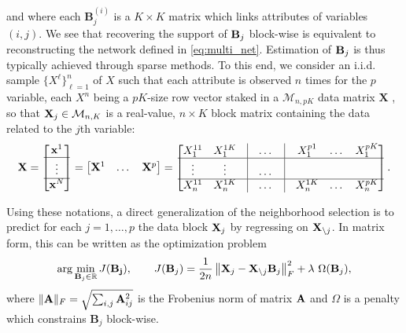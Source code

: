 and  where each  $\mathbf{B}_j^{(i)}$ is  a $K\times  K$ matrix  which
links attributes  of variables  $(i,j)$.  We  see that  recovering the
support of $\mathbf{B}_j$ block-wise is equivalent to reconstructing the network
defined  in  \eqref{eq:multi_net}.  Estimation   of  $\mathbf{B}_j$  is  thus
typically achieved through  sparse methods.  To this  end, we consider
an  i.i.d.   sample  $\{X^\ell\}_{\ell=1}^n$  of $X$  such  that  each
attribute is observed $n$ times for the $p$ variable, each $X^n$ being
a $pK$-size  row vector staked  in a $\mathcal{M}_{n,pK}$  data matrix
$\mathbf{X}$ , so that $\mathbf{X}_j  \in \mathcal{M}_{n,K}$ is a real-value,
$n \times  K$ block  matrix containing  the data  related to  the $j$th
variable:
\begin{multline*}
  \mathbf{X} = \begin{bmatrix}
    \mathbf{x}^1 \\ \hline
    \vdots \\\hline
    \mathbf{x}^N \\
  \end{bmatrix}
  = \begin{bmatrix}
    \mathbf{X}^1 & \dots & \mathbf{X}^p \\
  \end{bmatrix} 
  = \begin{bmatrix}
    X^{11}_1 & X^{1K}_1 & \vline & \dots & \vline & X^{p1}_1 & \dots & X^{pK}_1 \\ \hline
    \vdots & \vdots & \vline & \dots & \vline & & & \\ \hline
    X^{11}_n & X^{1K}_n & \vline & \dots & \vline & X^{1K}_n & \dots & X^{pK}_n \\ 
  \end{bmatrix}.
\end{multline*}

Using  these notations,  a direct  generalization of  the neighborhood
selection is to  predict for each $j=1,\dots,p$ the  data block $\mathbf{X}_j$
by regressing  on $\mathbf{X}_{\backslash  j}$. In matrix  form, this  can be
written as the optimization problem
\begin{equation}
  \label{eq:multi_penalized}
  \arg  \min_{\bB_j  \in  \mathbb{R}}  J(\mathbf{B_j}),  \qquad
  J(\bB_j) = \frac{1}{2n} \left\|
    \bX_j - \bX_{\backslash j}\bB_j\right\|_F^2 +
  \lambda \ \Omega(\bB_j),
\end{equation}
where $\|\mathbf{A}\|_F = \sqrt{\sum_{i,j} \mathbf{A}_{ij}^2}$ is the Frobenius norm
of  matrix   $\mathbf{A}$  and  $\Omega$   is  a  penalty   which  constrains
$\mathbf{B}_j$ block-wise.

